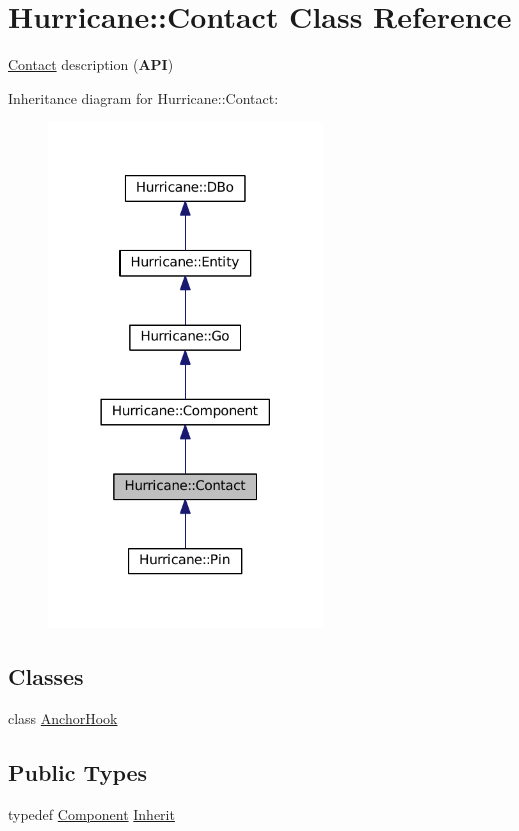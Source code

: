 \hypertarget{classHurricane_1_1Contact}{}\section{Hurricane\+:\+:Contact Class Reference}
\label{classHurricane_1_1Contact}


\mbox{\hyperlink{classHurricane_1_1Contact}{Contact}} description ({\bfseries A\+PI})  




Inheritance diagram for Hurricane\+:\+:Contact\+:\nopagebreak
\begin{figure}[H]
\begin{center}
\leavevmode
\includegraphics[width=206pt]{classHurricane_1_1Contact__inherit__graph}
\end{center}
\end{figure}
\subsection*{Classes}
\begin{DoxyCompactItemize}
\item 
class \mbox{\hyperlink{classHurricane_1_1Contact_1_1AnchorHook}{Anchor\+Hook}}
\end{DoxyCompactItemize}
\subsection*{Public Types}
\begin{DoxyCompactItemize}
\item 
typedef \mbox{\hyperlink{classHurricane_1_1Component}{Component}} \mbox{\hyperlink{classHurricane_1_1Contact_a422f15bba0561d8499c001fb8cbe6b67}{Inherit}}
\end{DoxyCompactItemize}
